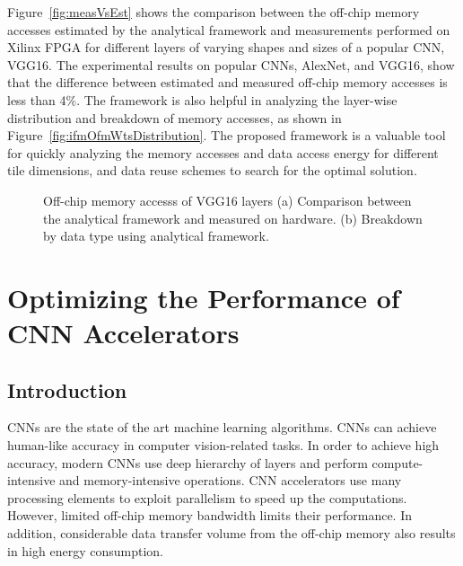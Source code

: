 \documentclass[a4paper,10pt]{article}
\begin{document}
Figure~\ref{fig:measVsEst} shows the comparison between the off-chip memory accesses estimated by the analytical framework and measurements performed on Xilinx FPGA for different layers of varying shapes and sizes of a popular CNN, VGG16. The experimental results on popular CNNs, AlexNet, and VGG16, show that the difference between estimated and measured off-chip memory accesses is less than 4\%. The framework is also helpful in analyzing the layer-wise distribution and breakdown of memory accesses, as shown in Figure~\ref{fig:ifmOfmWtsDistribution}. The proposed framework is a valuable tool for quickly analyzing the memory accesses and data access energy for different tile dimensions, and data reuse schemes to search for the optimal solution. 
\begin{figure}[!htb]
	\centering
	\captionsetup{font=sf}
	\hfil
	\hfil   
	\caption{Off-chip memory accesss of VGG16 layers (a) Comparison between the analytical framework and measured on hardware. (b) Breakdown by data type using analytical framework.}
	\label{fig:nnLayerData}
\end{figure}

\section{Optimizing the Performance of CNN Accelerators}
\subsection{Introduction}
CNNs are the state of the art machine learning algorithms. CNNs can achieve human-like accuracy in computer vision-related tasks. In order to achieve high accuracy, modern CNNs use deep hierarchy of layers and perform compute-intensive and memory-intensive operations. CNN accelerators use many processing elements to exploit parallelism to speed up the computations. However, limited off-chip memory bandwidth limits their performance. In addition, considerable data transfer volume from the off-chip memory also results in high energy consumption. 
\end{document}

